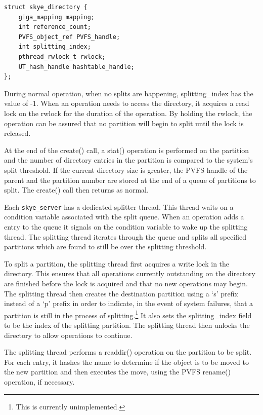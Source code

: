 \documentclass[letterpaper]{article}
\newcommand{\code}[1]{\texttt{#1}}
\begin{document}
\begin{lstlisting}
struct skye_directory {
    giga_mapping mapping;
    int reference_count;
    PVFS_object_ref PVFS_handle;
    int splitting_index;
    pthread_rwlock_t rwlock;
    UT_hash_handle hashtable_handle;
};
\end{lstlisting}

During normal operation, when no splits are happening, splitting\_\-index has the
value of -1.  When an operation needs to access the directory, it acquires a
read lock on the rwlock for the duration of the operation.  By holding the
rwlock, the operation can be assured that no partition will begin to split until
the lock is released.

At the end of the create() call, a stat() operation is performed on the
partition and the number of directory entries in the partition is compared to
the system's split threshold.  If the current directory size is greater, the
PVFS handle of the parent and the partition number are stored at the end of a
queue of partitions to split.  The create() call then returns as normal.

Each \code{skye\_\-server} has a dedicated splitter thread.  This thread waits on a
condition variable associated with the split queue.  When an operation adds a
entry to the queue it signals on the condition variable to wake up the splitting
thread.  The splitting thread iterates through the queue and splits all
specified partitions which are found to still be over the splitting threshold.

To split a partition, the splitting thread first acquires a write lock in the
directory.  This ensures that all operations currently outstanding on the
directory are finished before the lock is acquired and that no new operations
may begin.  The splitting thread then creates the destination partition using a
`s' prefix instead of a `p' prefix in order to indicate, in the event of system
failures, that a partition is still in the process of splitting.\footnote{This
is currently unimplemented.}  It also sets the splitting\_\-index field to be
the index of the splitting partition.  The splitting thread then unlocks the
directory to allow operations to continue.

The splitting thread performs a readdir() operation on the partition to be
split.  For each entry, it hashes the name to determine if the object is to be
moved to the new partition and then executes the move, using the PVFS rename()
operation, if necessary.
\end{document}
